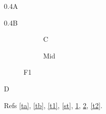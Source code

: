 \documentclass{article}
\begin{document}
\begin{table}\begin{subtable}{0.4\textwidth}A\caption{SA}\label{ta}\end{subtable}\begin{subtable}{0.4\textwidth}B\caption{SB}\label{tb}\end{subtable}\caption{T1}\label{t1}\end{table}
\begin{figure}\begin{subfigure}{0.4\textwidth}\begin{subtable}{\linewidth}C\caption{Sub}\label{st}\end{subtable}\caption{Mid}\label{fm}\end{subfigure}\caption{F1}\label{f1}\end{figure}
\begin{table}D\caption{T2}\label{t2}\end{table}
Refs \ref{ta}, \ref{tb}, \ref{t1}, \ref{st}, \ref{fm}, \ref{f1}, \ref{t2}.
\end{document}

